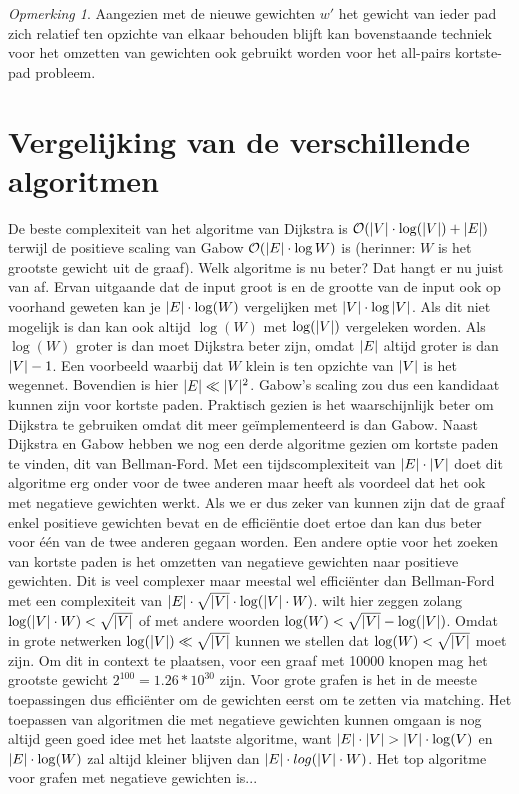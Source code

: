 \documentclass[conference]{IEEEtran}
\theoremstyle{definition}
\theoremstyle{remark}
\newtheorem*{remark}{Opmerking}
\DeclarePairedDelimiter{\card}{\vert}{\vert}  %
\begin{document}
\begin{remark}
    Aangezien met de nieuwe gewichten $w'$ het gewicht van ieder pad zich relatief ten opzichte van elkaar behouden blijft kan bovenstaande techniek voor het omzetten van gewichten ook gebruikt worden voor het all-pairs kortste-pad probleem.
\end{remark}

\section{Vergelijking van de verschillende algoritmen}
De beste complexiteit van het algoritme van Dijkstra is $\mathcal{O}(\card{V} \cdot \log(\card{V}) + \card{E})$ terwijl de positieve scaling van Gabow $\mathcal{O}(\card{E} \cdot \log{W})$ is (herinner: $W$ is het grootste gewicht uit de graaf). Welk algoritme is nu beter? Dat hangt er nu juist van af. Ervan uitgaande dat de input groot is en de grootte van de input ook op voorhand geweten kan je $\card{E} \cdot \log(W)$ vergelijken met $\card{V} \cdot \log{\card{V}}$. Als dit niet mogelijk is dan kan ook altijd $\log(W)$ met $\log(\card{V})$ vergeleken worden. Als $\log(W)$ groter is dan moet Dijkstra beter zijn, omdat $\card{E}$ altijd groter is dan $\card{V} - 1$. Een voorbeeld waarbij dat $W$ klein is ten opzichte van $\card{V}$ is het wegennet. Bovendien is hier $\card{E} \ll \card{V}^{2}$. Gabow's scaling zou dus een kandidaat kunnen zijn voor kortste paden. Praktisch gezien is het waarschijnlijk beter om Dijkstra te gebruiken omdat dit meer geïmplementeerd is dan Gabow. \cite{BGL}
Naast Dijkstra en Gabow hebben we nog een derde algoritme gezien om kortste paden te vinden, dit van Bellman-Ford. Met een tijdscomplexiteit van $\card{E} \cdot \card{V}$ doet dit algoritme erg onder voor de twee anderen maar heeft als voordeel dat het ook met negatieve gewichten werkt. Als we er dus zeker van kunnen zijn dat de graaf enkel positieve gewichten bevat en de efficiëntie doet ertoe dan kan dus beter voor één van de twee anderen gegaan worden. Een andere optie voor het zoeken van kortste paden is het omzetten van negatieve gewichten naar positieve gewichten. Dit is veel complexer maar meestal wel efficiënter dan Bellman-Ford met een complexiteit van $\card{E} \cdot \sqrt{\card{V}} \cdot \log(\card{V} \cdot W)$.  wilt hier zeggen zolang $\log(\card{V} \cdot W) < \sqrt{\card{V}}$ of met andere woorden $\log(W) < \sqrt{\card{V}} - \log(\card{V})$. Omdat in grote netwerken $\log(\card{V}) \ll \sqrt{\card{V}}$ kunnen we stellen dat $\log(W) < \sqrt{\card{V}}$ moet zijn. Om dit in context te plaatsen, voor een graaf met 10000 knopen mag het grootste gewicht $2^{100} = 1.26*10^{30}$ zijn. Voor grote grafen is het in de meeste toepassingen dus efficiënter om de gewichten eerst om te zetten via matching.
Het toepassen van algoritmen die met negatieve gewichten kunnen omgaan is nog altijd geen goed idee met het laatste algoritme, want $\card{E} \cdot \card{V} > \card{V} \cdot \log(V)$ en $\card{E} \cdot \log(W)$ zal altijd kleiner blijven dan $\card{E} \cdot log(\card{V} \cdot W)$.
Het top algoritme voor grafen met negatieve gewichten is...
\end{document}
